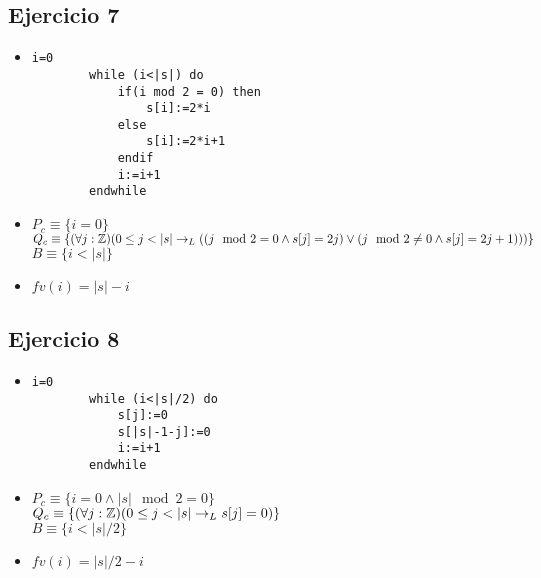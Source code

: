 \documentclass{article}
\begin{document}
\subsection*{Ejercicio 7}
\begin{itemize}
    \item 
    \begin{lstlisting}[style=base]
        i=0
        while (i<|s|) do
            if(i mod 2 = 0) then
                s[i]:=2*i
            else
                s[i]:=2*i+1
            endif
            i:=i+1
        endwhile
    \end{lstlisting}
    \item $P_c\equiv\{i=0\}$\\
    $Q_c\equiv\{(\forall j:\entero)(\enRango{j}{s}\to_L ((j\mod 2=0 \land s[j]=2j)\lor(j\mod 2\neq0 \land s[j]=2j+1)))\}$\\
    $B\equiv\{i<|s|\}$
    \item $fv(i)=|s|-i$
\end{itemize}
\subsection*{Ejercicio 8}
\begin{itemize}
    \item 
    \begin{lstlisting}[style=base]
        i=0
        while (i<|s|/2) do
            s[j]:=0
            s[|s|-1-j]:=0
            i:=i+1
        endwhile

    \end{lstlisting}
    \item $P_c\equiv\{i=0 \land |s|\mod 2=0\}$\\
    $Q_c\equiv\{(\forall j:\entero)(\enRango{j}{s}\to_L s[j]=0)\}$\\
    $B\equiv\{i<|s|/2\}$
    \item $fv(i)=|s|/2-i$
\end{itemize}
\end{document}
